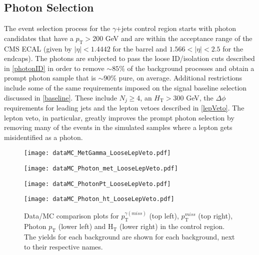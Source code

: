 \subsection{Photon Selection}
The event selection process for the $\gamma$+jets control region starts with photon candidates that have a $p_\text{T} > 200$ GeV and are within the acceptance range of the CMS ECAL (given by $|\eta| < 1.4442$ for the barrel and $1.566 < |\eta| < 2.5$ for the endcaps). The photons are subjected to pass the loose ID/isolation cuts described in \autoref{photonID} in order to remove $\sim85\%$ of the background processes and obtain a prompt photon sample that is $\sim90\%$ pure, on average. Additional restrictions include some of the same requirements imposed on the signal baseline selection discussed in \autoref{baseline}. These include $N_j \geq 4$, an $H_\text{T} > 300$ GeV, the $\Delta\phi$ requirements for leading jets and the lepton vetoes described in \autoref{lepVeto}. The lepton veto, in particular, greatly improves the prompt photon selection by removing many of the events in the simulated samples where a lepton gets misidentified as a photon.

\begin{figure}[tb]
\begin{center}
\begin{minipage}[b]{0.45\textwidth}
    \texttt{[image: dataMC\_MetGamma\_LooseLepVeto.pdf]}
\end{minipage}
\begin{minipage}[b]{0.45\textwidth}
    \texttt{[image: dataMC\_Photon\_met\_LooseLepVeto.pdf]}
\end{minipage}
\end{center}
\begin{center}
\begin{minipage}[b]{0.45\textwidth}
    \texttt{[image: dataMC\_PhotonPt\_LooseLepVeto.pdf]}
\end{minipage}
\begin{minipage}[b]{0.45\textwidth}
    \texttt{[image: dataMC\_Photon\_ht\_LooseLepVeto.pdf]}
\end{minipage}
\end{center}
\vspace{-1.5em}
\caption{Data/MC comparison plots for $p_\text{T}^{\gamma(miss)}$ (top left), $p_\text{T}^{miss}$ (top right), Photon $p_\text{T}$ (lower left) and H$_\text{T}$ (lower right) in the control region. The yields for each background are shown for each background, next to their respective names.}
\label{dataMCpho}
\end{figure}

